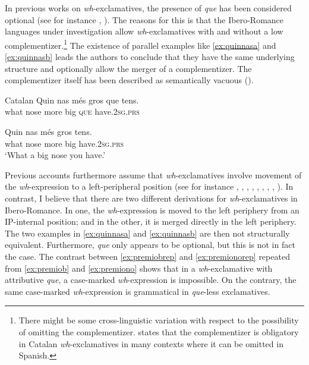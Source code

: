 In previous  works on   \textit{wh}-exclamatives, the presence of \emph{que} has been considered optional (see for instance \citealt{Villalba2003}, \citealt{Castroviejo2006}). The reasons for this is that the Ibero-Romance languages under investigation allow \textit{wh}-ex\-clam\-a\-tives   with and  without a low complementizer.\footnote{There might be some cross-linguistic variation with respect to the possibility of omitting the complementizer. \citet{GonzalezPlanas2010} states that the complementizer is obligatory in Catalan \textit{wh}-ex\-clam\-a\-tives in many contexts where it can be omitted in Spanish.} The  existence of parallel examples like \eqref{ex:quinnasa} and \eqref{ex:quinnasb} leads the authors to conclude that they have the same underlying structure and optionally allow the merger of a complementizer. The complementizer itself has  been described as semantically vacuous (\citealt{Castroviejo2006}). 

\ea\label{ex:quinnas} Catalan
\ea\label{ex:quinnasa}
\gll Quin nas més gros que tens. \\
what nose more big \textsc{que} have.\textsc{2sg.prs}\\
\ex\label{ex:quinnasb}

\gll Quin nas més gros tens. \\
what nose more big  have.\textsc{2sg.prs}\\
\glt `What a big nose you have.'
\z
\z



Previous accounts furthermore assume that  \textit{wh}-exclamatives involve movement of the \textit{wh}-expression to a left-peripheral position (see for instance \citealt{Beninca1996}, \citealt{Gutierrez-Rexach2001}, \citealt{Zanuttini2003}, \citealt{Ambar2003}, \citealt{Villalba2003,Villalba2008},  \citealt{Castroviejo2006}, \citealt{DemonteSoriano2009}, \citealt{Gutierrez-Rexach2011}, \citealt{Cruschina2015a}). In contrast, I believe that there are  two different derivations for \textit{wh}-exclamatives in Ibero-Romance.  In one, the \textit{wh}-expression is moved to the left periphery from an IP-internal position; and in the other,  it is merged directly in the left periphery. The two examples in \eqref{ex:quinnasa} and \eqref{ex:quinnasb} are then not structurally equivalent.  Furthermore, \emph{que} only appears to be optional, but this is not  in fact  the case. The contrast between \eqref{ex:premiobrep} and \eqref{ex:premionorep} repeated from \eqref{ex:premiob} and \eqref{ex:premiono} shows that in a \textit{wh}-exclamative with attributive \emph{que}, a case-marked \textit{wh}-expression is impossible. On the contrary, the same case-marked \textit{wh}-expression is grammatical in \emph{que}-less exclamatives.


